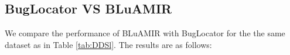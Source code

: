\documentclass[conference]{IEEEtran}
\begin{document}
\subsection{BugLocator VS BLuAMIR}
We compare the performance of BLuAMIR with BugLocator for the the same dataset as in Table \ref{tab:DDSl}. The results are as follows:
\begin{table}[htbp]
	\centering
	\caption{Performance Comparison between BugLocator and BLuAMIR}
	\label{tab:T4}
\end{table}
\end{document}
